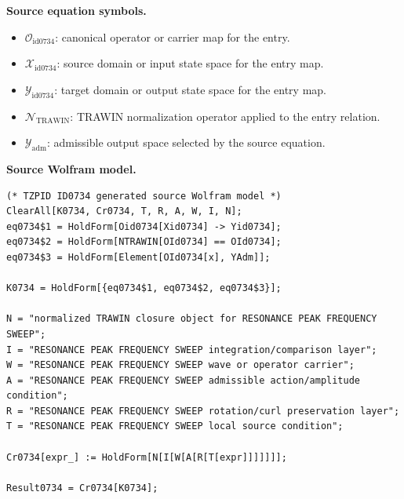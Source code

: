 \begin{minipage}[t]{0.49\linewidth}
\begingroup
\small
\raggedright
\textbf{Source equation symbols.}\par
\begin{itemize}[leftmargin=1.35em,itemsep=1pt,topsep=1pt,parsep=0pt]
    \item $\mathcal{O}_{\mathrm{id0734}}$: canonical operator or carrier map for the entry.
    \item $\mathcal{X}_{\mathrm{id0734}}$: source domain or input state space for the entry map.
    \item $\mathcal{Y}_{\mathrm{id0734}}$: target domain or output state space for the entry map.
    \item $\mathcal{N}_{\mathrm{TRAWIN}}$: TRAWIN normalization operator applied to the entry relation.
    \item $\mathcal{Y}_{\mathrm{adm}}$: admissible output space selected by the source equation.
\end{itemize}
\endgroup
\end{minipage}\hfill
\begin{minipage}[t]{0.47\linewidth}
\begingroup
\scriptsize
\raggedright
\textbf{Source Wolfram model.}\par
\begin{Verbatim}[fontsize=\tiny,breaklines=true,breakanywhere=true]
(* TZPID ID0734 generated source Wolfram model *)
ClearAll[K0734, Cr0734, T, R, A, W, I, N];
eq0734$1 = HoldForm[Oid0734[Xid0734] -> Yid0734];
eq0734$2 = HoldForm[NTRAWIN[OId0734] == OId0734];
eq0734$3 = HoldForm[Element[OId0734[x], YAdm]];

K0734 = HoldForm[{eq0734$1, eq0734$2, eq0734$3}];

N = "normalized TRAWIN closure object for RESONANCE PEAK FREQUENCY SWEEP";
I = "RESONANCE PEAK FREQUENCY SWEEP integration/comparison layer";
W = "RESONANCE PEAK FREQUENCY SWEEP wave or operator carrier";
A = "RESONANCE PEAK FREQUENCY SWEEP admissible action/amplitude condition";
R = "RESONANCE PEAK FREQUENCY SWEEP rotation/curl preservation layer";
T = "RESONANCE PEAK FREQUENCY SWEEP local source condition";

Cr0734[expr_] := HoldForm[N[I[W[A[R[T[expr]]]]]]];

Result0734 = Cr0734[K0734];
\end{Verbatim}
\endgroup
\end{minipage}

